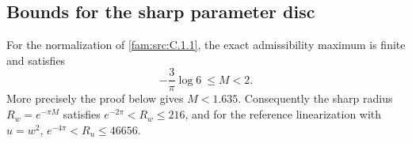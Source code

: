 \subsection{Bounds for the sharp parameter disc}\hypertarget{tag-01PM}{}\label{fam:section:C.2}
\begin{proposition}\hypertarget{tag-01QJ}{}\label{fam:src:C.2.1}\label{fam:st:C.2.1}

For the normalization of \ref{fam:src:C.1.1}, the exact admissibility maximum is finite
and satisfies
\[
 -\frac3\pi\log6\ \leq M<2.
\]
More precisely the proof below gives \(M<1.635\). Consequently the sharp
radius \(R_w=e^{-\pi M}\) satisfies
\(e^{-2\pi}<R_w\leq216\), and for the reference linearization with
\(u=w^2\), \(e^{-4\pi}<R_u\leq46656\).
\end{proposition}


